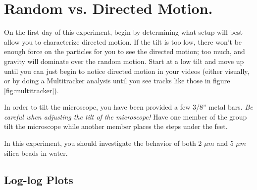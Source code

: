 \section{Random vs. Directed Motion.}
On the first day of this experiment, begin by determining what setup will best allow you to characterize directed motion. 
If the tilt is too low, there won't be enough force on the particles for you to see the directed motion; too much, and gravity will dominate over the random motion.
Start at a low tilt and move up until you can just begin to notice directed motion in your videos (either visually, or by doing a Multitracker analysis until you see tracks like those in figure \ref{fig:multitracker}).
\par
In order to tilt the microscope, you have been provided a few 3/8'' metal bars. 
\emph{Be careful when adjusting the tilt of the microscope!}
Have one member of the group tilt the microscope while another member places the steps under the feet.
\par 
In this experiment, you should investigate the behavior of both 2 $\mu m$ and 5 $\mu m$ silica beads in water.

\subsection*{Log-log Plots}

